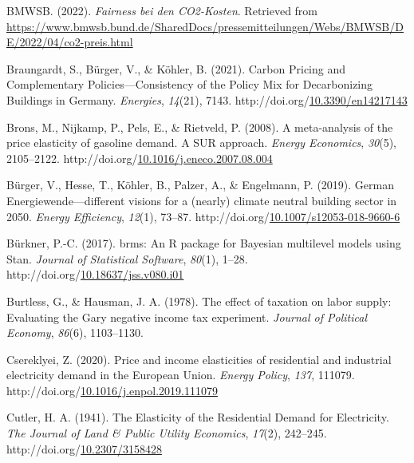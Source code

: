 \documentclass[12pt,twoside]{reedthesis}
\newlength{\cslhangindent}
\newenvironment{CSLReferences}[2] %
 {%
  \setlength{\parindent}{0pt}
  \ifodd #1 \everypar{\setlength{\hangindent}{\cslhangindent}}\ignorespaces\fi
  \ifnum #2 > 0
  \setlength{\parskip}{#2\baselineskip}
  \fi
 }%
 {}
\begin{document}
\begin{CSLReferences}{1}{0}
\leavevmode{}%
BMWSB. (2022). \emph{Fairness bei den CO2-Kosten}. Retrieved from \url{https://www.bmwsb.bund.de/SharedDocs/pressemitteilungen/Webs/BMWSB/DE/2022/04/co2-preis.html}

\leavevmode{}%
Braungardt, S., Bürger, V., \& Köhler, B. (2021). Carbon Pricing and Complementary Policies---Consistency of the Policy Mix for Decarbonizing Buildings in Germany. \emph{Energies}, \emph{14}(21), 7143. http://doi.org/\href{https://doi.org/10.3390/en14217143}{10.3390/en14217143}

\leavevmode{}%
Brons, M., Nijkamp, P., Pels, E., \& Rietveld, P. (2008). A meta-analysis of the price elasticity of gasoline demand. A SUR approach. \emph{Energy Economics}, \emph{30}(5), 2105--2122. http://doi.org/\href{https://doi.org/10.1016/j.eneco.2007.08.004}{10.1016/j.eneco.2007.08.004}

\leavevmode{}%
Bürger, V., Hesse, T., Köhler, B., Palzer, A., \& Engelmann, P. (2019). German Energiewende---different visions for a (nearly) climate neutral building sector in 2050. \emph{Energy Efficiency}, \emph{12}(1), 73--87. http://doi.org/\href{https://doi.org/10.1007/s12053-018-9660-6}{10.1007/s12053-018-9660-6}

\leavevmode{}%
Bürkner, P.-C. (2017). brms: An R package for Bayesian multilevel models using Stan. \emph{Journal of Statistical Software}, \emph{80}(1), 1--28. http://doi.org/\href{https://doi.org/10.18637/jss.v080.i01}{10.18637/jss.v080.i01}

\leavevmode{}%
Burtless, G., \& Hausman, J. A. (1978). The effect of taxation on labor supply: Evaluating the Gary negative income tax experiment. \emph{Journal of Political Economy}, \emph{86}(6), 1103--1130.

\leavevmode{}%
Csereklyei, Z. (2020). Price and income elasticities of residential and industrial electricity demand in the European Union. \emph{Energy Policy}, \emph{137}, 111079. http://doi.org/\href{https://doi.org/10.1016/j.enpol.2019.111079}{10.1016/j.enpol.2019.111079}

\leavevmode{}%
Cutler, H. A. (1941). The Elasticity of the Residential Demand for Electricity. \emph{The Journal of Land \& Public Utility Economics}, \emph{17}(2), 242--245. http://doi.org/\href{https://doi.org/10.2307/3158428}{10.2307/3158428}


\end{CSLReferences}
\end{document}
